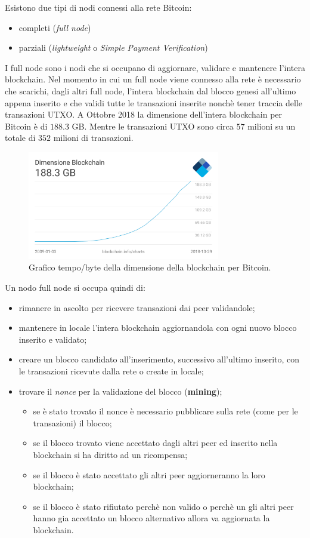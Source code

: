 Esistono due tipi di nodi connessi alla rete Bitcoin:
\begin{itemize}
    \item completi (\textit{full node})
    \item parziali (\textit{lightweight} o \textit{Simple Payment Verification})
\end{itemize}
I full node sono i nodi che si occupano di aggiornare, validare e mantenere l'intera blockchain. Nel momento in cui un full node viene connesso alla rete è necessario che scarichi, dagli altri full node, l'intera blockchain dal blocco genesi all'ultimo appena inserito e che validi tutte le transazioni inserite nonchè tener traccia delle transazioni UTXO.\newline
A Ottobre 2018 la dimensione dell'intera blockchain per Bitcoin è di $188.3$ GB. Mentre le transazioni UTXO sono circa $57$ milioni su un totale di $352$ milioni di transazioni.
\begin{figure}[H]
    \centering
    \includegraphics[width=0.75\textwidth]{images/bcsize.png}
    \caption{Grafico tempo/byte della dimensione della blockchain per Bitcoin.}
\end{figure}
Un nodo full node si occupa quindi di:
\begin{itemize}
    \item rimanere in ascolto per ricevere transazioni dai peer validandole;
    \item mantenere in locale l'intera blockchain aggiornandola con ogni nuovo blocco inserito e validato;
    \item creare un blocco candidato all'inserimento, successivo all'ultimo inserito, con le transazioni ricevute dalla rete o create in locale;
    \item trovare il \textit{nonce} per la validazione del blocco (\textbf{mining});
    \begin{itemize}
        \item se è stato trovato il nonce è necessario pubblicare sulla rete (come per le transazioni) il blocco;
        \item se il blocco trovato viene accettato dagli altri peer ed inserito nella blockchain si ha diritto ad un ricompensa;
        \item se il blocco è stato accettato gli altri peer aggiorneranno la loro blockchain;
        \item se il blocco è stato rifiutato perchè non valido o perchè un gli altri peer hanno gia accettato un blocco alternativo allora va aggiornata la blockchain.
    \end{itemize}
\end{itemize}

